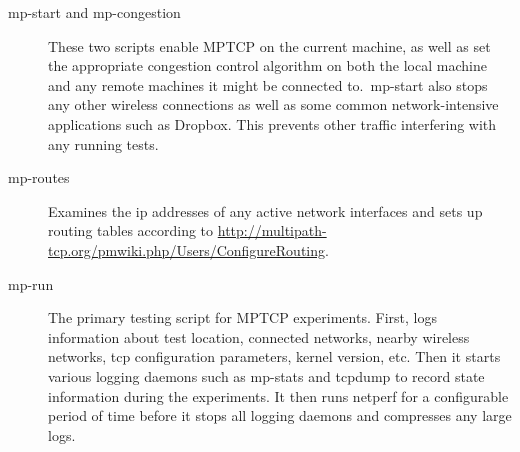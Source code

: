 \documentclass[12pt,a4paper]{article}
\begin{document}
\begin{description}
  \item[mp-start and mp-congestion]
    These two scripts enable MPTCP on the current machine, as well as set the
    appropriate congestion control algorithm on both the local machine and any
    remote machines it might be connected to.\ mp-start also stops any other
    wireless connections as well as some common network-intensive applications
    such as Dropbox. This prevents other traffic interfering with any running
    tests.
  \item[mp-routes]
    Examines the ip addresses of any active network interfaces and sets up
    routing tables according to
    \href{http://multipath-tcp.org/pmwiki.php/Users/ConfigureRouting}{http://multipath-tcp.org/\-pmwiki.php/\-Users/\-ConfigureRouting}.
  \item[mp-run]
    The primary testing script for MPTCP experiments. First, logs information
    about test location, connected networks, nearby wireless networks, tcp
    configuration parameters, kernel version, etc. Then it starts various
    logging daemons such as mp-stats and tcpdump to record state information
    during the experiments. It then runs netperf for a configurable period of
    time before it stops all logging daemons and compresses any large logs.


\end{description}
\end{document}
